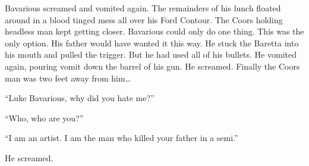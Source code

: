 Bavarious screamed and vomited again. The remainders of his lunch
floated around in a blood tinged mess all over his Ford Contour.
The Coors holding headless man kept getting closer. Bavarious could
only do one thing. This was the only option. His father would have
wanted it this way. He stuck the Baretta into his mouth and pulled
the trigger. But he had used all of his bullets. He vomited again,
pouring vomit down the barrel of his gun. He screamed. Finally the
Coors man was two feet away from him{\ldots}



``Luke Bavarious, why did you hate me?''

``Who, who are you?''

``I am an artist. I am the man who killed your father in a
semi.''

He screamed. 
 



